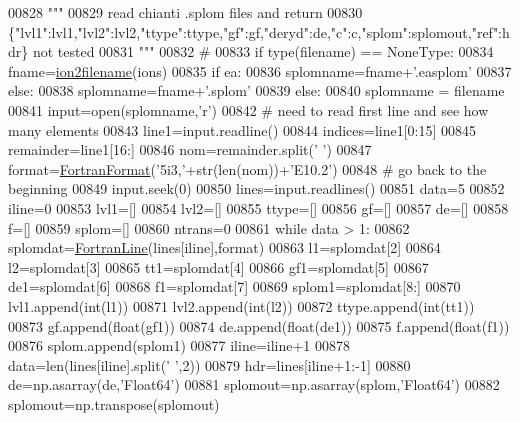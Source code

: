 \begin{DoxyCode}
{{{{{{{{{{{{00828     \textcolor{stringliteral}{"""}
00829 \textcolor{stringliteral}{    read chianti .splom files and return}
00830 \textcolor{stringliteral}{    \{"lvl1":lvl1,"lvl2":lvl2,"ttype":ttype,"gf":gf,"deryd":de,"c":c,"splom":splomout,"ref":hdr\} not tested}
00831 \textcolor{stringliteral}{    """}
00832     \textcolor{comment}{#}
00833     \textcolor{keywordflow}{if} type(filename) == NoneType:
00834         fname=\hyperlink{namespacepyneb_1_1utils_1_1__chianti__tools_ad4bc7b577fd4c3819ceb00b0a444351b}{ion2filename}(ions)
00835         \textcolor{keywordflow}{if} ea:
00836             splomname=fname+\textcolor{stringliteral}{'.easplom'}
00837         \textcolor{keywordflow}{else}:
00838             splomname=fname+\textcolor{stringliteral}{'.splom'}
00839     \textcolor{keywordflow}{else}:
00840         splomname = filename
00841     input=open(splomname,\textcolor{stringliteral}{'}\textcolor{stringliteral}{r')}
00842 \textcolor{stringliteral}{    }\textcolor{comment}{#  need to read first line and see how many elements}
00843     line1=input.readline()
00844     indices=line1[0:15]
00845     remainder=line1[16:]
00846     nom=remainder.split(\textcolor{stringliteral}{' '})
00847     format=\hyperlink{classpyneb_1_1utils_1_1_fortran_format_1_1_fortran_format}{FortranFormat}(\textcolor{stringliteral}{'5i3,'}+str(len(nom))+\textcolor{stringliteral}{'E10.2'})
00848     \textcolor{comment}{#  go back to the beginning}
00849     input.seek(0)
00850     lines=input.readlines()
00851     data=5
00852     iline=0
00853     lvl1=[]
00854     lvl2=[]
00855     ttype=[]
00856     gf=[]
00857     de=[]
00858     f=[]
00859     splom=[]
00860     ntrans=0
00861     \textcolor{keywordflow}{while} data > 1:
00862         splomdat=\hyperlink{classpyneb_1_1utils_1_1_fortran_format_1_1_fortran_line}{FortranLine}(lines[iline],format)
00863         l1=splomdat[2]
00864         l2=splomdat[3]
00865         tt1=splomdat[4]
00866         gf1=splomdat[5]
00867         de1=splomdat[6]
00868         f1=splomdat[7]
00869         splom1=splomdat[8:]
00870         lvl1.append(int(l1))
00871         lvl2.append(int(l2))
00872         ttype.append(int(tt1))
00873         gf.append(float(gf1))
00874         de.append(float(de1))
00875         f.append(float(f1))
00876         splom.append(splom1)
00877         iline=iline+1
00878         data=len(lines[iline].split(\textcolor{stringliteral}{' '},2))
00879     hdr=lines[iline+1:-1]
00880     de=np.asarray(de,\textcolor{stringliteral}{'Float64'})
00881     splomout=np.asarray(splom,\textcolor{stringliteral}{'Float64'})
00882     splomout=np.transpose(splomout)
}}}}}}}}}}}}
\end{DoxyCode}
